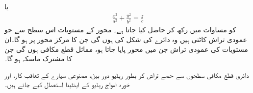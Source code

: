   یا 
\begin{align}
\frac{x^2}{a^2}+\frac{y^2}{b^2}=\frac{z}{c}
\end{align}
کو مساوات  میں  رکھ کر  حاصل کیا جاتا ہے۔ محور   کے  مستویات  اس سطح   سے  جو عمودی تراش کاٹتی ہیں وہ   دائرے کی شکل کی ہوں گی جن  کا  مرکز محور  پر  ہو گا۔ان مستویات  کی عمودی تراش جن میں   محور  پایا جاتا ہو،  مماثل قطع مکافی ہوں گی  جن کا مشترک  ماسکہ  ہو گا۔

دائری قطع مکافی سطحوں سے حصے تراش  کر بطور  ریڈیو دور بین،  مصنوعی سیارے  کے  تعاقب کار،  اور خورد امواج ریڈیو   کے اینٹینا  استعمال کیے جاتے ہیں۔
